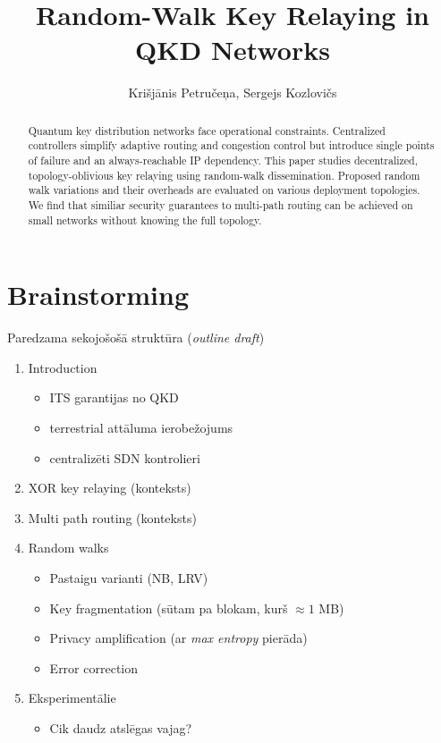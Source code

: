 \documentclass[journal]{IEEEtran}
\newcommand\draft[1]{\textcolor{RedOrange}{#1}}
\begin{document}
\title{Random-Walk Key Relaying in QKD Networks}

\author{Kri\v{s}j\=anis Petru\v{c}e\c{n}a, Sergejs Kozlovi\v{c}s}

\maketitle

\begin{abstract}
Quantum key distribution networks face operational constraints. Centralized controllers simplify adaptive routing and congestion control but introduce single points of failure and an always-reachable IP dependency. This paper studies decentralized, topology-oblivious key relaying using random-walk dissemination. Proposed random walk variations and their overheads are evaluated on various deployment topologies.
\draft{We find that similiar security guarantees to multi-path routing can be achieved on small networks without knowing the full topology.}
\end{abstract}


\section{Brainstorming}

Paredzama sekojošošā struktūra (\textit{outline draft})
\begin{enumerate}
    \item Introduction
    \begin{itemize}
        \item ITS garantijas no QKD
        \item terrestrial attāluma ierobežojums
        \item centralizēti SDN kontrolieri
    \end{itemize}
    \item XOR key relaying (konteksts)
    \item Multi path routing (konteksts)
    \item Random walks
    \begin{itemize}
        \item Pastaigu varianti (NB, LRV)
        \item Key fragmentation (sūtam pa blokam, kurš $\approx 1$ MB)
        \item Privacy amplification (ar \textit{max entropy} pierāda)
        \item Error correction
    \end{itemize}
    \item Eksperimentālie 
    \begin{itemize}
        \item Cik daudz atslēgas vajag?
        
    \end{itemize}
    
\end{enumerate}
\end{document}
